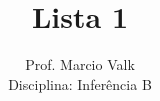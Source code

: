 \documentclass[10pt,brazil,addpoints]{exam}
\begin{document}
\title{Lista 1}


\author{
  Prof. Marcio Valk \\
  Disciplina: Inferência B\\
  \date{}
}


\maketitle
\end{document}
